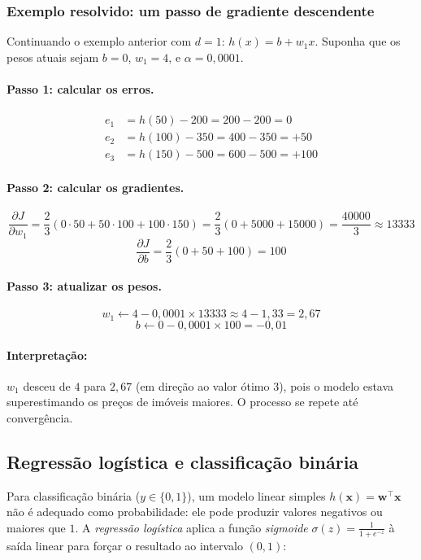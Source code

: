 \documentclass[12pt,a4paper]{article}
\begin{document}
\subsubsection{Exemplo resolvido: um passo de gradiente descendente}

Continuando o exemplo anterior com $d=1$: $h(x) = b + w_1 x$. Suponha que os pesos atuais sejam $b = 0$, $w_1 = 4$, e $\alpha = 0{,}0001$.

\paragraph{Passo 1: calcular os erros.}
\begin{align*}
e_1 &= h(50)  - 200 = 200 - 200 = 0 \\
e_2 &= h(100) - 350 = 400 - 350 = +50 \\
e_3 &= h(150) - 500 = 600 - 500 = +100
\end{align*}

\paragraph{Passo 2: calcular os gradientes.}
\[
\frac{\partial J}{\partial w_1} = \frac{2}{3}(0 \cdot 50 + 50 \cdot 100 + 100 \cdot 150) = \frac{2}{3}(0 + 5000 + 15000) = \frac{40000}{3} \approx 13333
\]
\[
\frac{\partial J}{\partial b} = \frac{2}{3}(0 + 50 + 100) = 100
\]

\paragraph{Passo 3: atualizar os pesos.}
\[
w_1 \leftarrow 4 - 0{,}0001 \times 13333 \approx 4 - 1{,}33 = 2{,}67
\]
\[
b \leftarrow 0 - 0{,}0001 \times 100 = -0{,}01
\]

\paragraph{Interpretação:} $w_1$ desceu de $4$ para $2{,}67$ (em direção ao valor ótimo $3$), pois o modelo estava superestimando os preços de imóveis maiores. O processo se repete até convergência.

\subsection{Regressão logística e classificação binária}
\label{subsec:logistica}

Para classificação binária ($y \in \{0, 1\}$), um modelo linear simples $h(\mathbf{x}) = \mathbf{w}^\top \mathbf{x}$ não é adequado como probabilidade: ele pode produzir valores negativos ou maiores que $1$. A \emph{regressão logística} aplica a função \emph{sigmoide} $\sigma(z) = \frac{1}{1 + e^{-z}}$ à saída linear para forçar o resultado ao intervalo $(0, 1)$:
\end{document}
